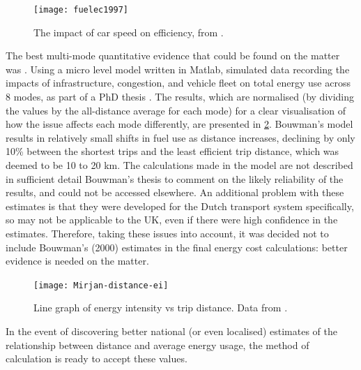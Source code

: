 \begin{figure}[h]
  \centerline{
    \texttt{[image: fuelec1997]}}
  \caption{The impact of car speed on efficiency, from
\citep{Anas2012-price-gas}.}
  \label{f:speeding-car}
\end{figure}

The best multi-mode quantitative evidence that could be found on the matter was
\citep{bouwman2000tracking}. Using a micro level model written in
Matlab, simulated data recording the impacts of infrastructure, congestion,
and vehicle fleet on total energy use across 8 modes, as part of a PhD thesis
\citep{bouwman2000tracking}. The results, which are
normalised (by dividing the values by the all-distance average for each mode)
for a clear visualisation of how the issue affects each
mode differently, are presented in \cref{f:mirjan}. Bouwman's
\citeyear{bouwman2000tracking} model results in relatively small
shifts in fuel use as distance increases, declining by only 10\% between the
shortest trips and the least efficient trip distance, which was deemed to be 10
to 20 km. The calculations made in the model are not described in sufficient
detail Bouwman's thesis to comment on the likely reliability of the results, and
could not be accessed elsewhere. An additional problem with these estimates is
that they were developed for the Dutch transport system specifically, so may
not be applicable to the UK, even if there were high confidence in
the estimates. Therefore, taking these issues into account, it was decided not
to include Bouwman's (2000) estimates in the final
energy cost calculations: better evidence is needed on the matter.

\begin{figure}[h]
  \centerline{
    \texttt{[image: Mirjan-distance-ei]}}
  \caption[Line graph of energy intensity vs trip distance]
  {Line graph of energy intensity vs trip distance. Data from
\citet{bouwman2000tracking}.}
  \label{f:mirjan}
\end{figure}

In the event of discovering better national (or even localised) estimates of
the relationship between distance and average energy usage, the method of
calculation is ready to accept these values.

